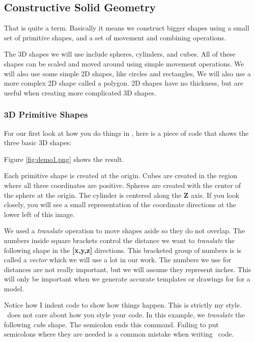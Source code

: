 \subsection{Constructive Solid Geometry}

That is quite a term. Basically it means we construct bigger shapes using a
small set of primitive shapes, and a set of movement and combining operations.

The 3D shapes we will use include spheres, cylinders, and cubes. All of these
shapes can be scaled and moved around using simple movement operations.  We
will also use some simple 2D shapes, like circles and rectangles, We will also
use a more complex 2D shape called a polygon.  2D shapes have no thickness, but
are useful when creating more complicated 3D shapes.

\subsubsection{3D Primitive Shapes}

For our first look at how you do things in \osc, here is a piece of code
that shows the three basic 3D shapes:


Figure \ref{fig:demo1.png} shows the result.


Each primitive shape is created at the origin. Cubes are created in the region
where all three coordinates are positive. Spheres are created with the center
of the sphere at the origin. The cylinder is centered along the {\bf Z} axis.
If you look closely, you will see a small representation of the coordinate
directions at the lower left of this image.

We used a {\it translate} operation to move shapes aside so they do not
overlap. The numbers inside square brackets control the distance we want to
{\it translate} the following shape in the {\bf [x,y,z]} directions. This
bracketed group of numbers is is called a {\it vector} which we will use a lot
in our work. The numbers we use for distances are not really important, but we
will assume they represent inches. This will only be important when we
generate accurate templates or drawings for for a model.

Notice how I indent code to show how things happen. This is strictly my style.
\osc\ does not care about how you style your code. In this example, we {\it
translate} the following {\it cube} shape. The semicolon ends this command.
Failing to put semicolons where they are needed is a common mistake when
writing \osc\ code.

